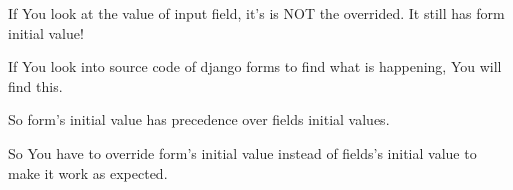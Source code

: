 \documentclass[a5paper,10pt,english]{sphinxmanual}
\begin{document}
If You look at the value of input field, it’s is NOT the overrided. It still has form initial value!

If You look into source code of django forms to find what is happening, You will find this.

\begin{sphinxVerbatim}[commandchars=\\\{\}]
  
          
\end{sphinxVerbatim}

So form’s initial value has precedence over fields initial values.

So You have to override form’s initial value instead of fields’s initial value to make it work as expected.
\end{document}

